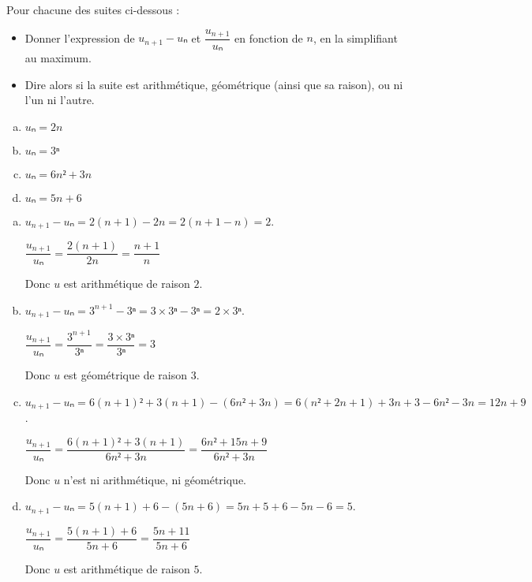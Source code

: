 \documentclass[
	classe=$1^{ere}STI2D$,
]{exercice}
\begin{document}
\begin{exercice}

	Pour chacune des suites ci-dessous :
	\begin{itemize}
		\item Donner l'expression de $u_{n+1} - uₙ$ et $\dfrac{u_{n+1}}{uₙ}$ en fonction de $n$, en la simplifiant au maximum.
		\item Dire alors si la suite est arithmétique, géométrique (ainsi que sa raison), ou ni l'un ni l'autre.
	\end{itemize}

	\begin{multicols}{2}
		\begin{enumerate}[a.]
			\item $uₙ = 2n$
			\item $uₙ = 3ⁿ$
			\item $uₙ = 6n² + 3n$
			\item $uₙ = 5n + 6$
		\end{enumerate}
	\end{multicols}

	\ifdefined\makeCorrection
		\begin{enumerate}[a.]
			\color{red}
			\item $u_{n+1} - uₙ = 2(n + 1) - 2n = 2(n + 1 - n) = 2$.

			      $\dfrac{u_{n+1}}{uₙ} = \dfrac{2(n + 1)}{2n} = \dfrac{n + 1}{n}$

			      Donc $u$ est arithmétique de raison $2$.
			\item $u_{n+1} - uₙ = 3^{n+1} - 3ⁿ = 3 × 3ⁿ - 3ⁿ = 2 × 3ⁿ$.

			      $\dfrac{u_{n+1}}{uₙ} = \dfrac{3^{n+1}}{3ⁿ} = \dfrac{3 × 3ⁿ}{3ⁿ} = 3$

			      Donc $u$ est géométrique de raison $3$.
			\item $u_{n+1} - uₙ = 6(n+1)² + 3(n + 1) - (6n² + 3n) = 6(n² + 2n + 1) + 3n + 3 - 6n² - 3n = 12n + 9$.

			      $\dfrac{u_{n+1}}{uₙ} = \dfrac{6(n+1)² + 3(n+1)}{6n² + 3n} = \dfrac{6n² + 15n + 9}{6n² + 3n}$

			      Donc $u$ n'est ni arithmétique, ni géométrique.
			\item $u_{n+1} - uₙ = 5(n + 1) + 6 - (5n + 6) = 5n + 5 + 6 - 5n - 6 = 5$.

			      $\dfrac{u_{n+1}}{uₙ} = \dfrac{5(n + 1) + 6}{5n + 6} = \dfrac{5n + 11}{5n + 6}$

			      Donc $u$ est arithmétique de raison $5$.
		\end{enumerate}
	\fi
\end{exercice}
\end{document}
